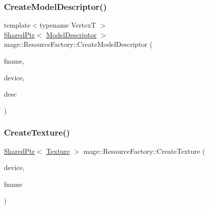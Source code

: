 \hypertarget{classmage_1_1_resource_factory_a04e226be9c659dc33d263dc82a2a1a30}{}\label{classmage_1_1_resource_factory_a04e226be9c659dc33d263dc82a2a1a30} 
\subsubsection{\texorpdfstring{Create\+Model\+Descriptor()}{CreateModelDescriptor()}}
{\footnotesize\ttfamily template$<$typename VertexT $>$ \\
\hyperlink{namespacemage_a1e01ae66713838a7a67d30e44c67703e}{Shared\+Ptr}$<$ \hyperlink{classmage_1_1_model_descriptor}{Model\+Descriptor} $>$ mage\+::\+Resource\+Factory\+::\+Create\+Model\+Descriptor (\begin{DoxyParamCaption}\item[{const wstring \&}]{fname,  }\item[{const \hyperlink{classmage_1_1_rendering_device}{Rendering\+Device} \&}]{device,  }\item[{const \hyperlink{structmage_1_1_mesh_descriptor}{Mesh\+Descriptor}$<$ VertexT $>$ \&}]{desc }\end{DoxyParamCaption})}

\hypertarget{classmage_1_1_resource_factory_a82dd7f58c91625cb261fa41ddbeefaec}{}\label{classmage_1_1_resource_factory_a82dd7f58c91625cb261fa41ddbeefaec} 
\subsubsection{\texorpdfstring{Create\+Texture()}{CreateTexture()}}
{\footnotesize\ttfamily \hyperlink{namespacemage_a1e01ae66713838a7a67d30e44c67703e}{Shared\+Ptr}$<$ \hyperlink{classmage_1_1_texture}{Texture} $>$ mage\+::\+Resource\+Factory\+::\+Create\+Texture (\begin{DoxyParamCaption}\item[{const \hyperlink{classmage_1_1_rendering_device}{Rendering\+Device} \&}]{device,  }\item[{const wstring \&}]{fname }\end{DoxyParamCaption})}

